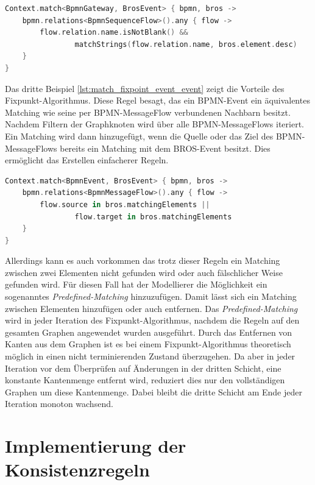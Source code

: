 \begin{lstlisting}[language=Kotlin, caption=Matching Regel von einem BPMN-Gateway und einem BROS-Event, label=lst:match_gateway_event]
Context.match<BpmnGateway, BrosEvent> { bpmn, bros ->
    bpmn.relations<BpmnSequenceFlow>().any { flow ->
        flow.relation.name.isNotBlank() &&
                matchStrings(flow.relation.name, bros.element.desc)
    }
}
\end{lstlisting}

Das dritte Beispiel \cref{lst:match_fixpoint_event_event} zeigt die Vorteile des Fixpunkt-Algorithmus.
Diese Regel besagt, das ein BPMN-Event ein äquivalentes Matching wie seine per BPMN-MessageFlow verbundenen Nachbarn besitzt.
Nachdem Filtern der Graphknoten wird über alle BPMN-MessageFlows iteriert.
Ein Matching wird dann hinzugefügt, wenn die Quelle oder das Ziel des BPMN-MessageFlows bereits ein Matching mit dem BROS-Event besitzt.
Dies ermöglicht das Erstellen einfacherer Regeln.

\begin{lstlisting}[language=Kotlin, caption=Fixpunkt Matching Regel von einem BPMN-BpmnEvent und einem BROS-Event, label=lst:match_fixpoint_event_event]
Context.match<BpmnEvent, BrosEvent> { bpmn, bros ->
    bpmn.relations<BpmnMessageFlow>().any { flow ->
        flow.source in bros.matchingElements ||
                flow.target in bros.matchingElements
    }
}
\end{lstlisting}

Allerdings kann es auch vorkommen das trotz dieser Regeln ein Matching zwischen zwei Elementen nicht gefunden wird oder auch fälschlicher Weise gefunden wird.
Für diesen Fall hat der Modellierer die Möglichkeit ein sogenanntes \emph{Predefined-Matching} hinzuzufügen.
Damit lässt sich ein Matching zwischen Elementen hinzufügen oder auch entfernen.
Das \emph{Predefined-Matching} wird in jeder Iteration des Fixpunkt-Algorithmus, nachdem die Regeln auf den gesamten Graphen angewendet wurden ausgeführt.
Durch das Entfernen von Kanten aus dem Graphen ist es bei einem Fixpunkt-Algorithmus theoretisch möglich in einen nicht terminierenden Zustand überzugehen.
Da aber in jeder Iteration vor dem Überprüfen auf Änderungen in der dritten Schicht, eine konstante Kantenmenge entfernt wird, reduziert dies nur den vollständigen Graphen um diese Kantenmenge.
Dabei bleibt die dritte Schicht am Ende jeder Iteration monoton wachsend. 

\pagebreak
\section{Implementierung der Konsistenzregeln}
\label{sec:implementaion_consistency_rules}

